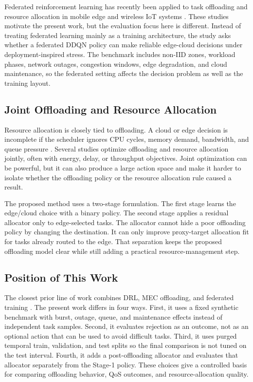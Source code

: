 Federated reinforcement learning has recently been applied to task offloading and resource allocation in mobile edge and wireless IoT systems \cite{ref02,ref04,ref05,ref06}. These studies motivate the present work, but the evaluation focus here is different. Instead of treating federated learning mainly as a training architecture, the study asks whether a federated DDQN policy can make reliable edge-cloud decisions under deployment-inspired stress. The benchmark includes non-IID zones, workload phases, network outages, congestion windows, edge degradation, and cloud maintenance, so the federated setting affects the decision problem as well as the training layout.

\subsection{Joint Offloading and Resource Allocation}

Resource allocation is closely tied to offloading. A cloud or edge decision is incomplete if the scheduler ignores CPU cycles, memory demand, bandwidth, and queue pressure \cite{ref17,ref18,ref19}. Several studies optimize offloading and resource allocation jointly, often with energy, delay, or throughput objectives. Joint optimization can be powerful, but it can also produce a large action space and make it harder to isolate whether the offloading policy or the resource allocation rule caused a result.

The proposed method uses a two-stage formulation. The first stage learns the edge/cloud choice with a binary \fedddqn{} policy. The second stage applies a residual allocator only to edge-selected tasks. The allocator cannot hide a poor offloading policy by changing the destination. It can only improve proxy-target allocation fit for tasks already routed to the edge. That separation keeps the proposed offloading model clear while still adding a practical resource-management step.



\subsection{Position of This Work}

The closest prior line of work combines DRL, MEC offloading, and federated training \cite{ref02,ref04,ref05,ref06}. The present work differs in four ways. First, it uses a fixed synthetic benchmark with burst, outage, queue, and maintenance effects instead of independent task samples. Second, it evaluates rejection as an outcome, not as an optional action that can be used to avoid difficult tasks. Third, it uses purged temporal train, validation, and test splits so the final comparison is not tuned on the test interval. Fourth, it adds a post-offloading allocator and evaluates that allocator separately from the Stage-1 policy. These choices give a controlled basis for comparing offloading behavior, QoS outcomes, and resource-allocation quality.
